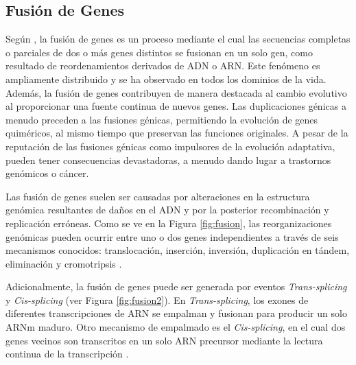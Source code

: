 \subsection{Fusión de Genes}


Según \cite{williford2013gene}, la fusión de genes es un proceso mediante el cual las secuencias completas o parciales de dos o más genes distintos se fusionan en un solo gen, como resultado de reordenamientos derivados de ADN o ARN. Este fenómeno es ampliamente distribuido y se ha observado en todos los dominios de la vida. Además, la fusión de genes contribuyen de manera destacada al cambio evolutivo al proporcionar una fuente continua de nuevos genes. Las duplicaciones génicas a menudo preceden a las fusiones génicas, permitiendo la evolución de genes quiméricos, al mismo tiempo que preservan las funciones originales. A pesar de la reputación de las fusiones génicas como impulsores de la evolución adaptativa, pueden tener consecuencias devastadoras, a menudo dando lugar a trastornos genómicos o cáncer.

Las fusión de genes suelen ser causadas por alteraciones en la estructura genómica resultantes de daños en el ADN y por la posterior recombinación y replicación erróneas. Como se ve en la Figura \ref{fig:fusion}, las reorganizaciones genómicas pueden ocurrir entre uno o dos genes independientes a través de seis mecanismos conocidos: translocación, inserción, inversión, duplicación en tándem, eliminación y cromotripsis \citep{taniue2021fusion, dai2018fusion}.

Adicionalmente, la fusión de genes puede ser generada por eventos \textit{Trans-splicing} y \textit{Cis-splicing} (ver Figura \ref{fig:fusion2}). En \textit{Trans-splicing}, los exones de diferentes transcripciones de ARN se empalman y fusionan para producir un solo ARNm maduro. Otro mecanismo de empalmado es el \textit{Cis-splicing}, en el cual dos genes vecinos son transcritos en un solo ARN precursor mediante la lectura continua de la transcripción \citep{taniue2021fusion}.


